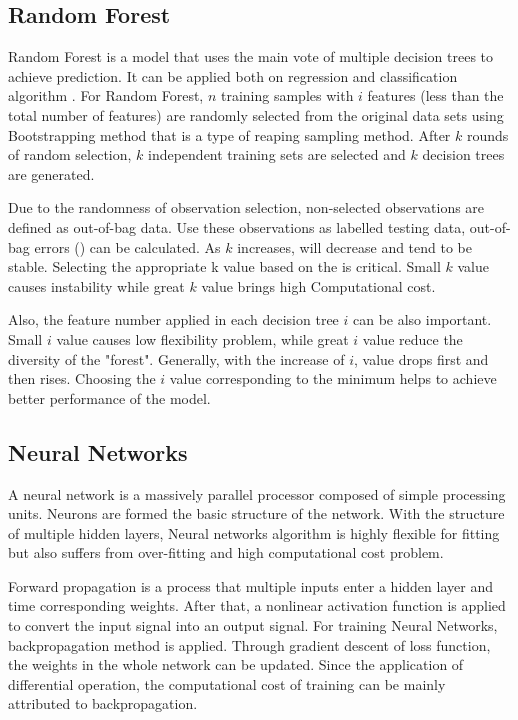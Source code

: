 \subsection{Random Forest}
Random Forest is a model that uses the main vote of multiple decision trees to achieve prediction. It can be applied both on regression and classification algorithm \cite{tan2018prediction}. For Random Forest, $n$ training samples with $i$ features (less than the total number of features) are randomly selected from the original data sets using Bootstrapping method that is a type of reaping sampling method. After $k$ rounds of random selection, $k$ independent training sets are selected and $k$ decision trees are generated.

Due to the randomness of observation selection, non-selected observations are defined as out-of-bag data. Use these observations as labelled testing data, out-of-bag errors () can be calculated. As  $k$ increases,  will decrease and tend to be stable. Selecting the appropriate k value based on the  is critical.  Small $k$ value causes  instability  while great $k$ value brings high Computational cost.

Also, the feature number applied in each decision tree $i$ can be also important. Small $i$ value causes low flexibility problem, while great $i$ value reduce the diversity of the "forest". Generally, with the increase of $i$,  value drops first and then rises. Choosing the $i$ value corresponding to the minimum  helps to achieve better performance of the model.

\subsection{Neural Networks}
A neural network is a massively parallel processor composed of simple processing units. Neurons are formed the basic structure of the network. With the structure of multiple hidden layers, Neural networks algorithm is highly flexible for fitting but also suffers from over-fitting and high computational cost problem. 

Forward propagation is a process that multiple inputs enter a hidden layer and time corresponding weights. After that, a nonlinear activation function is applied to convert the input signal into an output signal. For training Neural Networks, backpropagation method is applied. Through gradient descent of loss function, the weights in the whole network can be updated. Since the application of differential operation, the computational cost of training can be mainly attributed to backpropagation.






